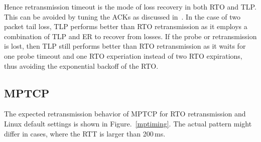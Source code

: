 \documentclass[10pt,conference,compsoc]{IEEEtran}
\begin{document}
Hence retransmission timeout is the mode of loss recovery in both RTO and TLP. This can be avoided by tuning
the ACKs as discussed in~\cite{Rajiullah:2015}. In the case of two packet tail loss, TLP performs better than RTO retransmission as it employs a combination of TLP and ER to recover from losses. If the probe or retransmission is lost, then TLP still performs better than RTO retransmission as it waits for one probe timeout and one RTO experiation instead of two RTO expirations, thus avoiding the exponential backoff of the RTO.

\subsection{MPTCP}


The expected retransmission behavior of MPTCP for RTO retransmission and Linux default settings is shown 
in Figure.~\ref{mptiming}. The actual pattern might differ in cases, where the RTT is larger than 200\,ms. 
\renewcommand{\thesubfigure}{\roman{subfigure}}
\end{document}
